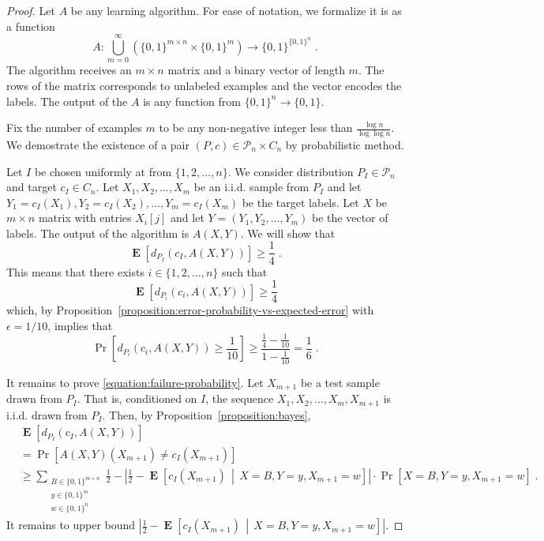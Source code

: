 \documentclass[10pt]{article}
\renewcommand{\P}{\mathcal{P}}
\DeclareMathOperator{\Exp}{\mathbf{E}}
\begin{document}
\begin{proof}
Let $A$ be any learning algorithm. For ease of notation, we formalize it is as a function
$$
A:\bigcup_{m=0}^\infty \left(\{0,1\}^{m \times n} \times \{0,1\}^m\right) \to \{0,1\}^{\{0,1\}^n} \; .
$$
The algorithm receives an $m \times n$ matrix and a binary vector of length $m$.
The rows of the matrix corresponds to unlabeled examples and the vector encodes
the labels. The output of the $A$ is any function from $\{0,1\}^n \to \{0,1\}$.

Fix the number of examples $m$ to be any non-negative integer less than
$\frac{\log n}{\log \log n}$. We demostrate the existence of a pair $(P,c) \in
\P_n \times C_n$ by probabilistic method.

Let $I$ be chosen uniformly at from $\{1,2,\dots,n\}$. We consider distribution $P_I \in \P_n$ and target $c_I \in C_n$.
Let $X_1, X_2, \dots, X_m$ be an i.i.d. sample from $P_I$ and
let $Y_1 = c_I(X_1), Y_2 = c_I(X_2), \dots, Y_m = c_I(X_m)$ be the target
labels. Let $X$ be $m \times n$ matrix with entries $X_i[j]$ and let $Y = (Y_1,
Y_2, \dots, Y_m)$ be the vector of labels. The output of the algorithm is $A(X,Y)$.
We will show that
\begin{equation}
\label{equation:failure-probability}
\Exp \left[d_{P_I}(c_I, A(X,Y)) \right] \ge \frac{1}{4} \; .
\end{equation}
This means that there exists $i \in \{1,2,\dots,n\}$ such that
$$
\Exp \left[d_{P_i}(c_i, A(X,Y)) \right] \ge \frac{1}{4}
$$
which, by Proposition~\ref{proposition:error-probability-vs-expected-error} with $\epsilon=1/10$, implies that
$$
\Pr \left[ d_{P_i}(c_i, A(X,Y)) \ge \frac{1}{10} \right] \ge \frac{\frac{1}{4} - \frac{1}{10}}{1 - \frac{1}{10}} = \frac{1}{6} \; .
$$

It remains to prove \eqref{equation:failure-probability}.
Let $X_{m+1}$ be a test sample drawn from $P_I$. That is, conditioned on $I$, the sequence $X_1, X_2, \dots, X_m, X_{m+1}$ is i.i.d. drawn from $P_I$.
Then, by Proposition~\ref{proposition:bayes},
\begin{align*}
& \Exp \left[d_{P_I}(c_I, A(X,Y))\right] \\
& = \Pr\left[ A(X,Y)(X_{m+1}) \neq c_I(X_{m+1}) \right] \\
& \ge \sum_{\substack{B \in \{0,1\}^{m \times n} \\ y \in \{0,1\}^m \\ w \in \{0,1\}^n}} \frac{1}{2} - \left| \frac{1}{2} - \Exp\left[ c_I(X_{m+1}) \, \middle| \, X = B, Y = y, X_{m+1} = w \right] \right| \cdot \Pr \left[X = B, Y = y, X_{m+1} = w \right] \; .
\end{align*}
It remains to upper bound $\left| \frac{1}{2} - \Exp\left[ c_I(X_{m+1}) \, \middle| \, X = B, Y = y, X_{m+1} = w \right] \right|$.


\end{proof}
\end{document}
